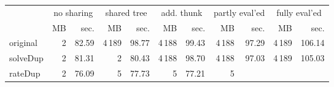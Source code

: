 \makeatletter
\begin{tabular}{lrrrrrrrrrr}
 \\
& \multicolumn{2}{c}{no sharing}& \multicolumn{2}{c}{shared tree}& \multicolumn{2}{c}{add. thunk}& \multicolumn{2}{c}{partly eval'ed}& \multicolumn{2}{c}{fully eval'ed} \\
& MB & sec.& MB & sec.& MB & sec.& MB & sec.& MB & sec. \\ \midrule 
original%
&
 {\def\@currentlabel{2}\label{stats:slow:Original:Unshared:mem}2} &
 {\def\@currentlabel{82.59}\label{stats:slow:Original:Unshared:time}82.59}&
 {\def\@currentlabel{4\,189}\label{stats:slow:Original:Shared:mem}4\,189} &
 {\def\@currentlabel{98.77}\label{stats:slow:Original:Shared:time}98.77}&
 {\def\@currentlabel{4\,188}\label{stats:slow:Original:SharedThunk:mem}4\,188} &
 {\def\@currentlabel{99.43}\label{stats:slow:Original:SharedThunk:time}99.43}&
 {\def\@currentlabel{4\,188}\label{stats:slow:Original:SharedEvaled:mem}4\,188} &
 {\def\@currentlabel{97.29}\label{stats:slow:Original:SharedEvaled:time}97.29}&
 {\def\@currentlabel{4\,189}\label{stats:slow:Original:SharedFull:mem}4\,189} &
 {\def\@currentlabel{106.14}\label{stats:slow:Original:SharedFull:time}106.14} \\
\textsf{solveDup}%
&
 {\def\@currentlabel{2}\label{stats:slow:SolveDup:Unshared:mem}2} &
 {\def\@currentlabel{81.31}\label{stats:slow:SolveDup:Unshared:time}81.31}&
 {\def\@currentlabel{2}\label{stats:slow:SolveDup:Shared:mem}2} &
 {\def\@currentlabel{80.43}\label{stats:slow:SolveDup:Shared:time}80.43}&
 {\def\@currentlabel{4\,188}\label{stats:slow:SolveDup:SharedThunk:mem}4\,188} &
 {\def\@currentlabel{98.70}\label{stats:slow:SolveDup:SharedThunk:time}98.70}&
 {\def\@currentlabel{4\,188}\label{stats:slow:SolveDup:SharedEvaled:mem}4\,188} &
 {\def\@currentlabel{97.03}\label{stats:slow:SolveDup:SharedEvaled:time}97.03}&
 {\def\@currentlabel{4\,189}\label{stats:slow:SolveDup:SharedFull:mem}4\,189} &
 {\def\@currentlabel{105.03}\label{stats:slow:SolveDup:SharedFull:time}105.03} \\
\textsf{rateDup}%
&
 {\def\@currentlabel{2}\label{stats:slow:RateDup:Unshared:mem}2} &
 {\def\@currentlabel{76.09}\label{stats:slow:RateDup:Unshared:time}76.09}&
 {\def\@currentlabel{5}\label{stats:slow:RateDup:Shared:mem}5} &
 {\def\@currentlabel{77.73}\label{stats:slow:RateDup:Shared:time}77.73}&
 {\def\@currentlabel{5}\label{stats:slow:RateDup:SharedThunk:mem}5} &
 {\def\@currentlabel{77.21}\label{stats:slow:RateDup:SharedThunk:time}77.21}&
 {\def\@currentlabel{5}\label{stats:slow:RateDup:SharedEvaled:mem}5} &

\end{tabular}
